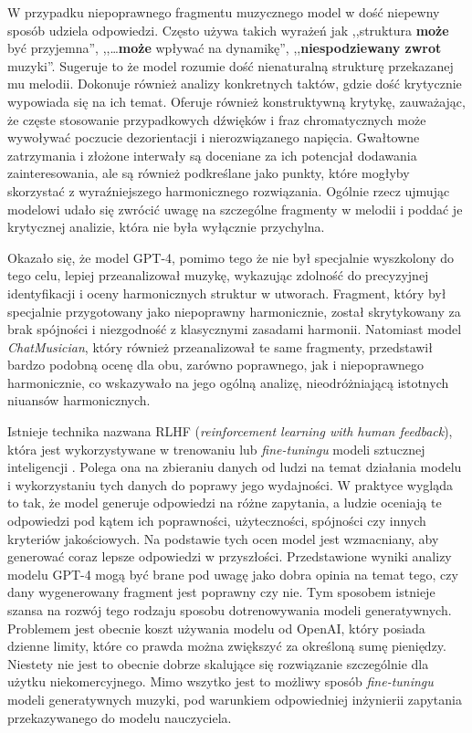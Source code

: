 \documentclass[data-science]{agh-wi} %
\begin{document}
W przypadku niepoprawnego fragmentu muzycznego model w dość niepewny sposób udziela odpowiedzi. Często używa takich wyrażeń jak ,,struktura \textbf{może} być przyjemna'', ,,\dots \textbf{może} wpływać na dynamikę'', ,,\textbf{niespodziewany zwrot} muzyki''. Sugeruje to że model rozumie dość nienaturalną strukturę przekazanej mu melodii. Dokonuje również analizy konkretnych taktów, gdzie dość krytycznie wypowiada się na ich temat. Oferuje również konstruktywną krytykę, zauważając, że częste stosowanie przypadkowych dźwięków i fraz chromatycznych może wywoływać poczucie dezorientacji i nierozwiązanego napięcia. Gwałtowne zatrzymania i złożone interwały są doceniane za ich potencjał dodawania zainteresowania, ale są również podkreślane jako punkty, które mogłyby skorzystać z wyraźniejszego harmonicznego rozwiązania. Ogólnie rzecz ujmując modelowi udało się zwrócić uwagę na szczególne fragmenty w melodii i poddać je krytycznej analizie, która nie była wyłącznie przychylna.

Okazało się, że model GPT-4, pomimo tego że nie był specjalnie wyszkolony do tego celu, lepiej przeanalizował muzykę, wykazując zdolność do precyzyjnej identyfikacji i oceny harmonicznych struktur w utworach. Fragment, który był specjalnie przygotowany jako niepoprawny harmonicznie, został skrytykowany za brak spójności i niezgodność z klasycznymi zasadami harmonii. Natomiast model \textit{ChatMusician}, który również przeanalizował te same fragmenty, przedstawił bardzo podobną ocenę dla obu, zarówno poprawnego, jak i niepoprawnego harmonicznie, co wskazywało na jego ogólną analizę, nieodróżniającą istotnych niuansów harmonicznych.

Istnieje technika nazwana RLHF (\textit{reinforcement learning with human feedback}), która jest wykorzystywane w trenowaniu lub \textit{fine-tuningu} modeli sztucznej inteligencji \cite{rl_training}. Polega ona na zbieraniu danych od ludzi na temat działania modelu i wykorzystaniu tych danych do poprawy jego wydajności. W praktyce wygląda to tak, że model generuje odpowiedzi na różne zapytania, a ludzie oceniają te odpowiedzi pod kątem ich poprawności, użyteczności, spójności czy innych kryteriów jakościowych. Na podstawie tych ocen model jest wzmacniany, aby generować coraz lepsze odpowiedzi w przyszłości. Przedstawione wyniki analizy modelu GPT-4 mogą być brane pod uwagę jako dobra opinia na temat tego, czy dany wygenerowany fragment jest poprawny czy nie. Tym sposobem istnieje szansa na rozwój tego rodzaju sposobu dotrenowywania modeli generatywnych. Problemem jest obecnie koszt używania modelu od OpenAI, który posiada dzienne limity, które co prawda można zwiększyć za określoną sumę pieniędzy. Niestety nie jest to obecnie dobrze skalujące się rozwiązanie szczególnie dla użytku niekomercyjnego. Mimo wszytko jest to możliwy sposób \textit{fine-tuningu} modeli generatywnych muzyki, pod warunkiem odpowiedniej inżynierii zapytania przekazywanego do modelu nauczyciela.
\end{document}
